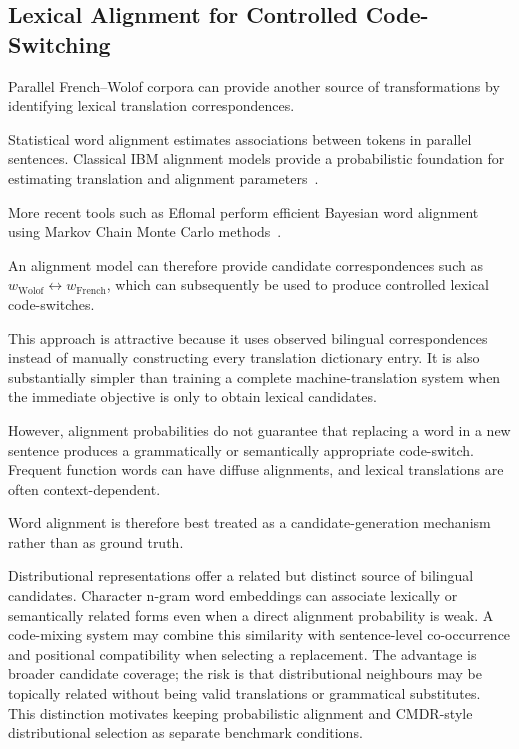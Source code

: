 \documentclass[12pt, a4paper, twoside, openany]{report}
\begin{document}
\subsection{Lexical Alignment for Controlled Code-Switching}

Parallel French--Wolof corpora can provide another source of transformations by identifying lexical translation correspondences.

Statistical word alignment estimates associations between tokens in parallel sentences. Classical IBM alignment models provide a probabilistic foundation for estimating translation and alignment parameters~\cite{brown1993statistical}.

More recent tools such as Eflomal perform efficient Bayesian word alignment using Markov Chain Monte Carlo methods~\cite{ostling2016alignment}.

An alignment model can therefore provide candidate correspondences such as $w_{\text{Wolof}} \leftrightarrow w_{\text{French}}$, which can subsequently be used to produce controlled lexical code-switches.

This approach is attractive because it uses observed bilingual correspondences instead of manually constructing every translation dictionary entry. It is also substantially simpler than training a complete machine-translation system when the immediate objective is only to obtain lexical candidates.

However, alignment probabilities do not guarantee that replacing a word in a new sentence produces a grammatically or semantically appropriate code-switch. Frequent function words can have diffuse alignments, and lexical translations are often context-dependent.

Word alignment is therefore best treated as a candidate-generation mechanism rather than as ground truth.

Distributional representations offer a related but distinct source of bilingual candidates. Character n-gram word embeddings can associate lexically or semantically related forms even when a direct alignment probability is weak. A code-mixing system may combine this similarity with sentence-level co-occurrence and positional compatibility when selecting a replacement. The advantage is broader candidate coverage; the risk is that distributional neighbours may be topically related without being valid translations or grammatical substitutes. This distinction motivates keeping probabilistic alignment and CMDR-style distributional selection as separate benchmark conditions.
\end{document}
